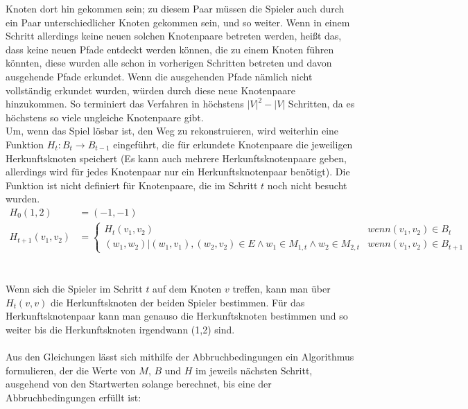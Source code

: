 \documentclass[a4paper,10pt,ngerman]{scrartcl}
\begin{document}
Knoten dort hin gekommen sein; zu diesem Paar müssen die Spieler auch durch ein Paar unterschiedlicher Knoten gekommen sein,
und so weiter. Wenn in einem Schritt allerdings keine neuen solchen Knotenpaare betreten werden, heißt das, dass keine neuen
Pfade entdeckt werden können, die zu einem Knoten führen könnten, diese wurden alle schon in vorherigen Schritten betreten und
davon ausgehende Pfade erkundet. Wenn die ausgehenden Pfade nämlich nicht vollständig erkundet wurden, würden durch diese neue
Knotenpaare hinzukommen. So terminiert das Verfahren in höchstens $|V|^2 - |V|$ Schritten, da es höchstens so viele ungleiche Knotenpaare gibt. \\
Um, wenn das Spiel lösbar ist, den Weg zu rekonstruieren, wird weiterhin eine  Funktion $H_t:B_t \rightarrow B_{t-1}$ eingeführt,
die für erkundete Knotenpaare die jeweiligen Herkunftsknoten speichert (Es kann auch mehrere Herkunftsknotenpaare geben, allerdings wird für
jedes Knotenpaar nur ein Herkunftsknotenpaar benötigt). Die Funktion ist nicht definiert für Knotenpaare, die im Schritt $t$ noch nicht besucht wurden.
\begin{align*}
  H_0(1,2)         & = (-1, -1)                                                                                                        \\
  H_{t+1}(v_1,v_2) & = \begin{cases}
                         H_{t}(v_1, v_2)                                                                    & wenn (v_1,v_2) \in B_t     \\
                         (w_1, w_2)|(w_1,v_1), (w_2,v_2) \in E \land w_1 \in M_{1,t} \land w_2 \in M_{2, t} & wenn (v_1,v_2) \in B_{t+1}
                       \end{cases}
\end{align*}\\\\
Wenn sich die Spieler im Schritt $t$ auf dem Knoten $v$ treffen, kann man über $H_{t}(v,v)$ die Herkunftsknoten der
beiden Spieler bestimmen. Für das Herkunftsknotenpaar kann man genauso die Herkunftsknoten bestimmen und so weiter
bis die Herkunftsknoten irgendwann (1,2) sind.\\\\
Aus den Gleichungen lässt sich mithilfe der Abbruchbedingungen ein Algorithmus formulieren, der die Werte von $M$, $B$
und $H$ im jeweils nächsten Schritt, ausgehend von den Startwerten solange berechnet, bis eine der Abbruchbedingungen erfüllt ist:
\end{document}
